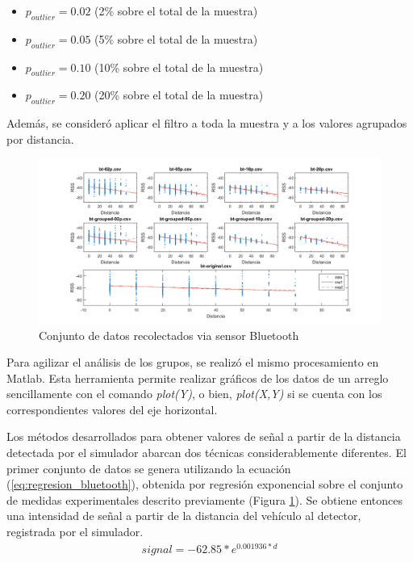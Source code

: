 \begin{itemize}
    \item $p_{outlier}=0.02$ (2\% sobre el total de la muestra)
    \item $p_{outlier}=0.05$ (5\% sobre el total de la muestra)
    \item $p_{outlier}=0.10$ (10\% sobre el total de la muestra)
    \item $p_{outlier}=0.20$ (20\% sobre el total de la muestra)
\end{itemize}

Además, se consideró aplicar el filtro a toda la muestra y a los valores agrupados por distancia. 
\begin{figure}[!htp]
	\centering
	\includegraphics[width=\textwidth]{images/distancia_rss.png}
	\caption{Conjunto de datos recolectados via sensor Bluetooth}
    \label{fig:datos-bluetooth}
\end{figure}

Para agilizar el análisis de los grupos, se realizó el mismo procesamiento en Matlab. Esta herramienta permite realizar gráficos  de los datos de un arreglo sencillamente con el comando \textit{plot(Y)}, o bien, \textit{plot(X,Y)} si se cuenta con los correspondientes valores del eje horizontal.

Los métodos desarrollados para obtener valores de señal a partir de la distancia detectada por el simulador abarcan dos técnicas considerablemente diferentes. El primer conjunto de datos se genera utilizando la ecuación (\ref{eq:regresion_bluetooth}), obtenida por regresión exponencial sobre el conjunto de medidas experimentales descrito previamente (Figura \ref{fig:datos-bluetooth}). Se obtiene entonces una intensidad de señal a partir de la distancia del vehículo al detector, registrada por el simulador.
\begin{align}\label{eq:regresion_bluetooth}
 signal = -62.85 * e^{0.001936*d}
\end{align}

